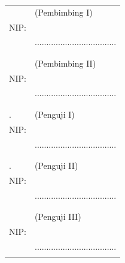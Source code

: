\noindent
\begin{tabularx}{\textwidth}{X l}
  \advisor{}               & (Pembimbing I)                      \\
  NIP: \advisornip{}       &                                     \\
                           & ................................... \\
                           &                                     \\
                           &                                     \\
  \coadvisor{}             & (Pembimbing II)                     \\
  NIP: \coadvisornip{}     &                                     \\
                           & ................................... \\
                           &                                     \\
                           &                                     \\
  \examinerone{}.          & (Penguji I)                         \\
  NIP: \examineronenip{}   &                                     \\
                           & ................................... \\
                           &                                     \\
                           &                                     \\
  \examinertwo{}.          & (Penguji II)                        \\
  NIP: \examinertwonip{}   &                                     \\
                           & ................................... \\
                           &                                     \\
                           &                                     \\
\ifbool{bpenguji3}{
  \examinerthree{}.        & (Penguji III)                       \\
  NIP: \examinerthreenip{} &                                     \\
                          & ................................... \\
}


\end{tabularx}
